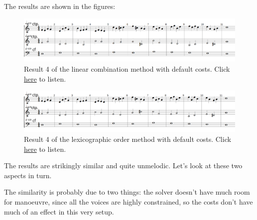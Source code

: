 The results are shown in the figures:

\begin{figure}[h]
    \centering
    \includegraphics[width=1\textwidth]{Images/Experiments/linear-combination-2sp.png}
    \caption{Result 4 of the linear combination method with default costs. Click \href{https://youtu.be/_VrM76hp1v8}{here} to listen.}
    \label{fig:combili-2sp}
\end{figure}

\begin{figure}[h]
    \centering
    \includegraphics[width=1\textwidth]{Images/Experiments/basic-lexico-2sp.png}
    \caption{Result 4 of the lexicographic order method with default costs. Click \href{https://youtu.be/msY1LOGw3v8}{here} to listen.}
    \label{fig:lexico-2sp}
\end{figure}

The results are strikingly similar and quite unmelodic. Let's look at these two aspects in turn.

The similarity is probably due to two things: the solver doesn't have much room for manoeuvre, since all the voices are highly constrained, so the costs don't have much of an effect in this very setup. 

